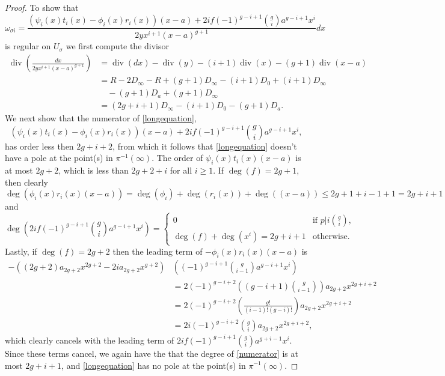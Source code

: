 \documentclass[draft, 11pt]{article} %
\theoremstyle{plain}
\theoremstyle{remark}
\DeclareMathOperator{\di}{div}
\begin{document}
\begin{proof}
To show that
\begin{equation}\label{longequation}
\omega_{\sigma i} =  \frac{(\psi_i(x)t_i(x) - \phi_i(x)r_i(x))(x-a) + 2if(-1)^{g-i+1}\binom{g}{i} a^{g-i+1}x^i}{2yx^{i+1}(x-a)^{g+1}}dx
\end{equation}
is regular on $U_\sigma$ we first compute the divisor
\begin{align*}
\di\left( \frac{dx}{2yx^{i+1}(x-a)^{g+1}}\right) & = \di(dx) - \di(y) - (i+1)\di(x) - (g+1)\di(x-a) \\
& = R - 2D_\infty - R + (g+1)D_\infty - (i+1)D_0 + (i+1)D_\infty \\
& \quad - (g+1)D_a + (g+1)D_\infty \\
& = (2g+i+1)D_\infty -(i+1)D_0 - (g+1)D_a.
\end{align*}
We next show that the numerator of \eqref{longequation},
\begin{equation}\label{numerator}
{(\psi_i(x)t_i(x) - \phi_i(x)r_i(x))(x-a) + 2if(-1)^{g-i+1}\binom{g}{i} a^{g-i+1}x^i},
\end{equation}
has order less then $2g+i+2$, from which it follows that \eqref{longequation} doesn't have a pole at the point(s) in $\pi^{-1}(\infty)$.
The order of $\psi_i(x)t_i(x)(x-a)$ is at most $2g+2$, which is less than $2g+2+i$ for all $i \geq 1$.
If $\deg(f) = 2g+1$, then clearly
\[
\deg\left( \phi_i(x)r_i(x)(x-a) \right) = \deg(\phi_i) + \deg(r_i(x)) + \deg((x-a)) \leq 2g+1 + i-1 +1 = 2g+i+1
\]
and
\[
\deg \left( 2if(-1)^{g-i+1}\binom{g}{i} a^{g-i+1}x^i \right)  = \begin{cases} 0 & \text {if } p|i\binom{g}{i}, \\
 \deg(f) + \deg(x^i) =  2g+i+1 & \text{otherwise.}
\end{cases}
\]
Lastly, if $\deg(f) = 2g+2$ then the leading term of $-\phi_i(x)r_i(x)(x-a)$ is
\begin{align*}
-((2g+2)a_{2g+2}x^{2g+2}-2ia_{2g+2}x^{g+2})&\left( (-1)^{g-i+1}\binom{g}{i-1}a^{g-i+1}x^i\right) \\
&  = 2(-1)^{g-i+2}\left( (g-i+1)\binom{g}{i-1} \right) a_{2g+2}x^{2g+i+2} \\
& = 2(-1)^{g-i+2} \left( \frac{g!}{(i-1)!(g-i)!} \right) a_{2g+2}x^{2g+i+2} \\
& = 2i(-1)^{g-i+2}\binom{g}{i}a_{2g+2}x^{2g+i+2},
\end{align*}
which clearly cancels with the leading term of $2if(-1)^{g-i+1}\binom{g}{i}a^{g+i-1}x^i$.
Since these terms cancel, we again have the that the degree of \eqref{numerator} is at most $2g+i+1$, and \eqref{longequation} has no pole at the point(s) in $\pi^{-1}(\infty)$.


\end{proof}
\end{document}
